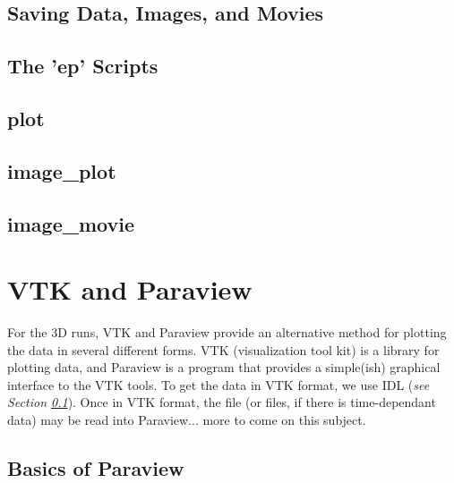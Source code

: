 \subsection{Saving Data, Images, and Movies}\label{ss:savingdata}

\subsection{The 'ep' Scripts}

\subsection{plot}

\subsection{image\_plot}

\subsection{image\_movie}

\section{VTK and Paraview}

For the 3D runs, VTK and Paraview provide an alternative method for
plotting the data in several different forms. VTK (visualization tool
kit) is a library for plotting data, and Paraview is a program that
provides a simple(ish) graphical interface to the VTK tools. To get
the data in VTK format, we use IDL (\emph{see Section
  \ref{ss:savingdata}}). Once in VTK format, the file (or files, if
there is time-dependant data) may be read into Paraview... more to
come on this subject.

\subsection{Basics of Paraview}






